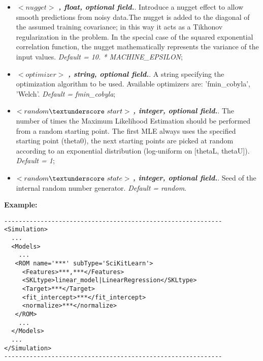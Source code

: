 \begin{itemize}
\item $<nugget>$ \textbf{\textit{, float, optional field.}}.  Introduce a nugget effect to allow smooth predictions from noisy data.The nugget is added to the diagonal of the assumed training covariance; in this way it acts as a Tikhonov regularization in the problem. In the special case of the squared exponential correlation function, the nugget mathematically represents the variance of the input values. \textit{Default = 10. * MACHINE\_EPSILON};
\item $<optimizer>$ \textbf{\textit{, string, optional field.}}.  A string specifying the optimization algorithm to be used. Available optimizers are: 'fmin\_cobyla', 'Welch'. \textit{Default = fmin\_cobyla};
\item $<random\textunderscore~start>$ \textbf{\textit{, integer, optional field.}}. The number of times the Maximum Likelihood Estimation should be performed from a random starting point. The first MLE always uses the specified starting point (theta0), the next starting points are picked at random according to an exponential distribution (log-uniform on [thetaL, thetaU]). \textit{Default = 1};
\item $<random\textunderscore~state>$ \textbf{\textit{, integer, optional field.}}. Seed of the internal random number generator. \textit{Default = random}.
\end{itemize}

\textbf{Example:}
\begin{lstlisting}[style=XML]
------------------------------------------------------------
<Simulation>
  ...
  <Models>
    ...
   <ROM name='***' subType='SciKitLearn'>
     <Features>***,***</Features>
     <SKLtype>linear_model|LinearRegression</SKLtype>
     <Target>***</Target>
     <fit_intercept>***</fit_intercept>
     <normalize>***</normalize>
   </ROM>
    ...
  </Models>
  ...
</Simulation>
------------------------------------------------------------
\end{lstlisting}


